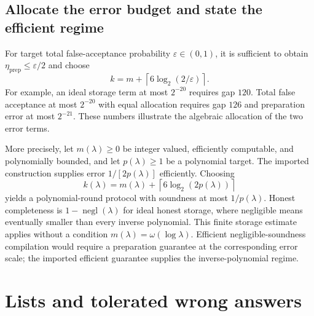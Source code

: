 \documentclass[11pt,a4paper]{article}
\newcommand{\newsection}[1]{\section{#1}}
\begin{document}
\subsection{Allocate the error budget and state the efficient regime}
For target total false-acceptance probability $\varepsilon\in(0,1)$, it is sufficient to obtain $\eta_{\mathrm{prep}}\leq\varepsilon/2$ and choose
\begin{equation}\label{eq:k-choice}
k=m+\left\lceil6\log_2(2/\varepsilon)\right\rceil.
\end{equation}
For example, an ideal storage term at most $2^{-20}$ requires gap $120$. Total false acceptance at most $2^{-20}$ with equal allocation requires gap $126$ and preparation error at most $2^{-21}$. These numbers illustrate the algebraic allocation of the two error terms.

More precisely, let $m(\lambda)\geq0$ be integer valued, efficiently computable, and polynomially bounded, and let $p(\lambda)\geq1$ be a polynomial target. The imported construction supplies error $1/[2p(\lambda)]$ efficiently. Choosing
\[
k(\lambda)=m(\lambda)+\left\lceil6\log_2(2p(\lambda))\right\rceil
\]
yields a polynomial-round protocol with soundness at most $1/p(\lambda)$. Honest completeness is $1-\operatorname{negl}(\lambda)$ for ideal honest storage, where negligible means eventually smaller than every inverse polynomial. This finite storage estimate applies without a condition $m(\lambda)=\omega(\log\lambda)$. Efficient negligible-soundness compilation would require a preparation guarantee at the corresponding error scale; the imported efficient guarantee supplies the inverse-polynomial regime.

\newsection{Lists and tolerated wrong answers}
\end{document}
